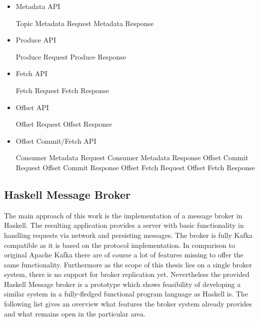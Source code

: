 \begin{itemize}
    \item Metadata API
    \begin{itemize}
        \tick Topic Metadata Request
        \tick Metadata Response
    \end{itemize}
    \item Produce API
    \begin{itemize}
        \tick Produce Request
        \tick Produce Response
    \end{itemize}
    \item Fetch API
    \begin{itemize}
        \tick Fetch Request
        \tick Fetch Response
    \end{itemize}
    \item Offset API
    \begin{itemize}
        \fail Offset Request
        \fail Offset Response
    \end{itemize}
    \item Offset Commit/Fetch API
    \begin{itemize}
        \fail Consumer Metadata Request
        \fail Consumer Metadata Response
        \fail Offset Commit Request
        \fail Offset Commit Response
        \fail Offset Fetch Request
        \fail Offset Fetch Response
    \end{itemize}
\end{itemize}

\subsection{Haskell Message Broker}

The main approach of this work is the implementation of a message broker in
Haskell. The resulting application provides a server with basic functionality in
handling requests via network and persisting messages. The broker is fully Kafka
compatible as it is based on the protocol implementation.  In comparison to
original Apache Kafka there are of course a lot of features missing to offer the
same functionality. Furthermore as the scope of this thesis lies on a single
broker system, there is no support for broker replication yet. Nevertheless the
provided Haskell Message broker is a prototype which shows feasibility of
developing a similar system in a fully-fledged functional program language as
Haskell is. The following list gives an overview what features the broker system
already provides and what remains open in the particular area.

